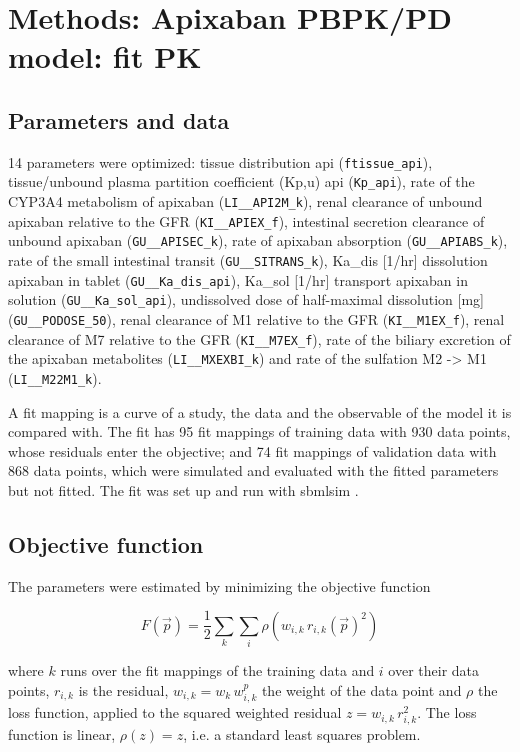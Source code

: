\section{Methods: Apixaban PBPK/PD model: fit PK}

\subsection{Parameters and data}

14 parameters were optimized: tissue distribution api (\texttt{ftissue\_api}), tissue/unbound plasma partition coefficient (Kp,u) api (\texttt{Kp\_api}), rate of the CYP3A4 metabolism of apixaban (\texttt{LI\_\_API2M\_k}), renal clearance of unbound apixaban relative to the GFR (\texttt{KI\_\_APIEX\_f}), intestinal secretion clearance of unbound apixaban (\texttt{GU\_\_APISEC\_k}), rate of apixaban absorption (\texttt{GU\_\_APIABS\_k}), rate of the small intestinal transit (\texttt{GU\_\_SITRANS\_k}), Ka\_dis [1/hr] dissolution apixaban in tablet (\texttt{GU\_\_Ka\_dis\_api}), Ka\_sol [1/hr] transport apixaban in solution (\texttt{GU\_\_Ka\_sol\_api}), undissolved dose of half-maximal dissolution [mg] (\texttt{GU\_\_PODOSE\_50}), renal clearance of M1 relative to the GFR (\texttt{KI\_\_M1EX\_f}), renal clearance of M7 relative to the GFR (\texttt{KI\_\_M7EX\_f}), rate of the biliary excretion of the apixaban metabolites (\texttt{LI\_\_MXEXBI\_k}) and rate of the sulfation M2 -> M1 (\texttt{LI\_\_M22M1\_k}).

A fit mapping is a curve of a study, the data and the observable of the model it is compared with. The fit has 95 fit mappings of training data with 930 data points, whose residuals enter the objective; and 74 fit mappings of validation data with 868 data points, which were simulated and evaluated with the fitted parameters but not fitted. The fit was set up and run with sbmlsim \cite{Koenig2026_sbmlsim}.

\subsection{Objective function}

The parameters were estimated by minimizing the objective function

\begin{equation}
F(\vec{p}) = \frac{1}{2} \sum_{k} \sum_{i} \rho\left(w_{i,k}\, r_{i,k}(\vec{p})^2\right)
\end{equation}

where $k$ runs over the fit mappings of the training data and $i$ over their data points, $r_{i,k}$ is the residual, $w_{i,k} = w_k\, w^{p}_{i,k}$ the weight of the data point and $\rho$ the loss function, applied to the squared weighted residual $z = w_{i,k}\, r_{i,k}^2$. The loss function is linear, $\rho(z) = z$, i.e. a standard least squares problem.

